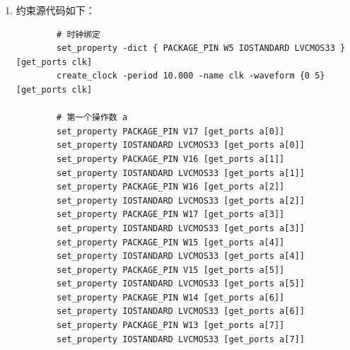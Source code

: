 \documentclass{SYSUReport}
\begin{document}
\begin{enumerate}[label={\chinese*、},labelsep=0pt]
\begin{enumerate}[label = \arabic*、]
\begin{enumerate}[label = （\arabic*）、]
\begin{itemize}
                仅适用于有符号运算，直接取结果最高位：
                \begin{verbatim}
                    flag_next[1] = result8[7];
                \end{verbatim}

                \item 零标志 ZF
                结果为0即置位：
                \begin{verbatim}
                    flag_next[2] = (next_out == 0);
                \end{verbatim}

                \item 无符号进位/借位 CF
                
                仅在无符号语义下有效，从 \verb|result9[8]|
                \begin{verbatim}
                   flag_next[3] = result9[8];
                \end{verbatim}

                使用 9 位宽度是为了捕获加法进位或减法借位，这是无符号运算不可或缺的标志位。

            \end{itemize}
            \item 结果寄存
            所有运算与标志位均在时钟上升沿锁存输出，符合同步电路规范：
            \begin{verbatim}
                always @(posedge clk) begin
                    out  <= result8;
                    flag <= flag_next;
                end
            \end{verbatim}
        \end{enumerate}
    \item 约束源代码如下：
    \begin{verbatim}
        # 时钟绑定
        set_property -dict { PACKAGE_PIN W5 IOSTANDARD LVCMOS33 } [get_ports clk]
        create_clock -period 10.000 -name clk -waveform {0 5} [get_ports clk]

        # 第一个操作数 a
        set_property PACKAGE_PIN V17 [get_ports a[0]]
        set_property IOSTANDARD LVCMOS33 [get_ports a[0]]
        set_property PACKAGE_PIN V16 [get_ports a[1]]
        set_property IOSTANDARD LVCMOS33 [get_ports a[1]]
        set_property PACKAGE_PIN W16 [get_ports a[2]]
        set_property IOSTANDARD LVCMOS33 [get_ports a[2]]
        set_property PACKAGE_PIN W17 [get_ports a[3]]
        set_property IOSTANDARD LVCMOS33 [get_ports a[3]]
        set_property PACKAGE_PIN W15 [get_ports a[4]]
        set_property IOSTANDARD LVCMOS33 [get_ports a[4]]
        set_property PACKAGE_PIN V15 [get_ports a[5]]
        set_property IOSTANDARD LVCMOS33 [get_ports a[5]]
        set_property PACKAGE_PIN W14 [get_ports a[6]]
        set_property IOSTANDARD LVCMOS33 [get_ports a[6]]
        set_property PACKAGE_PIN W13 [get_ports a[7]]
        set_property IOSTANDARD LVCMOS33 [get_ports a[7]]


\end{verbatim}
\end{enumerate}
\end{enumerate}
\end{document}
